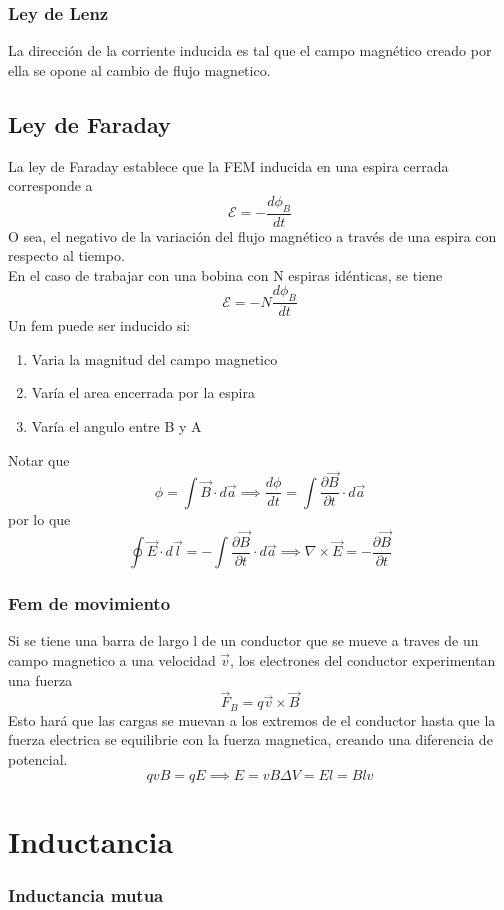 \documentclass[a4paper, 10pt]{article}
\begin{document}
\begin{multicols*}{2}
  \subsubsection{Ley de Lenz}
  La dirección de la corriente inducida es tal que
  el campo magnético creado por ella se opone al cambio de flujo
  magnetico.

  \subsection{Ley de Faraday}
	La ley de Faraday establece que la FEM inducida en una espira cerrada corresponde a
	$$\mathcal{E} = -\frac{d \phi_{B}}{dt}$$
	O sea, el negativo de la variación del flujo magnético a través de una espira con respecto al tiempo.\\
	En el caso de trabajar con una bobina con N espiras idénticas, se tiene
	$$\mathcal{E} = -N \frac{d \phi_{B}}{dt}$$
  Un fem puede ser inducido si:
  \begin{enumerate}
    \item Varia la magnitud del campo magnetico
    \item Varía el area encerrada por la espira
    \item Varía el angulo entre B y A
  \end{enumerate}
  Notar que
  \begin{equation}
    \phi = \int \vec{B} \cdot d\vec{a} \implies \frac{d \phi}{dt} 
    = \int \frac{\partial \vec{B}}{\partial t} \cdot d \vec{a}
  \end{equation}
  por lo que
  \begin{equation}
    \oint \vec{E} \cdot d\vec{l} = -\int \frac{\partial \vec{B}}{\partial t} \cdot d \vec{a}
    \implies \nabla \times \vec{E} = - \frac{\partial \vec{B}}{\partial t}
  \end{equation}

  \subsubsection{Fem de movimiento}
  Si se tiene una barra de largo l de un conductor que se 
  mueve a traves de un campo magnetico a una velocidad $\vec{v}$,
  los electrones del conductor experimentan una fuerza
  \begin{equation}
    \vec{F}_B = q \vec{v} \times \vec{B}
  \end{equation}
  Esto hará que las cargas se muevan a los extremos de el conductor
  hasta que la fuerza electrica se equilibrie con la fuerza magnetica,
  creando una diferencia de potencial.
  \begin{equation}
    qvB = qE \implies E = vB \Delta V = E l = B l v
  \end{equation}

	\section{Inductancia}
  \subsubsection{Inductancia mutua}

\end{multicols*}
\end{document}
